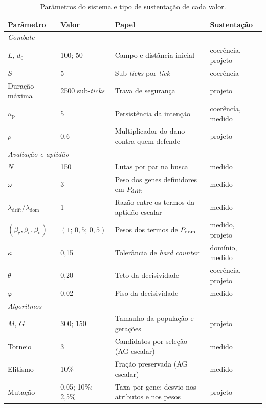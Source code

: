 \begin{table}[htbp]
    \caption{Parâmetros do sistema e tipo de sustentação de cada valor.}
    \label{tab: parametros}
    \centering
    \footnotesize
    \begin{tabularx}{\textwidth}{l l X l}
        \toprule
        \textbf{Parâmetro} & \textbf{Valor} & \textbf{Papel} & \textbf{Sustentação} \\
        \midrule
        \multicolumn{4}{l}{\textit{Combate}} \\
        $L$, $d_0$ & 100; 50 & Campo e distância inicial & coerência, projeto \\
        $S$ & 5 & Sub-\textit{ticks} por \textit{tick} & coerência \\
        Duração máxima & 2500 sub-\textit{ticks} & Trava de segurança & projeto \\
        $n_{\mathrm{p}}$ & 5 & Persistência da intenção & coerência, medido \\
        $\rho$ & 0,6 & Multiplicador do dano contra quem defende & projeto \\
        \midrule
        \multicolumn{4}{l}{\textit{Avaliação e aptidão}} \\
        $N$ & 150 & Lutas por par na busca & medido \\
        $\omega$ & 3 & Peso dos genes definidores em $P_{\mathrm{drift}}$ & medido \\
        $\lambda_{\mathrm{drift}}/\lambda_{\mathrm{dom}}$ & 1 & Razão entre os termos da aptidão escalar & medido \\
        $(\beta_{\mathrm{g}}, \beta_{\mathrm{c}}, \beta_{\mathrm{d}})$ & $(1;\, 0{,}5;\, 0{,}5)$ & Pesos dos termos de $P_{\mathrm{dom}}$ & medido, projeto \\
        $\kappa$ & 0,15 & Tolerância de \textit{hard counter} & domínio, medido \\
        $\theta$ & 0,20 & Teto da decisividade & coerência, projeto \\
        $\varphi$ & 0,02 & Piso da decisividade & medido \\
        \midrule
        \multicolumn{4}{l}{\textit{Algoritmos}} \\
        $M$, $G$ & 300; 150 & Tamanho da população e gerações & projeto \\
        Torneio & 3 & Candidatos por seleção (AG escalar) & medido \\
        Elitismo & 10\% & Fração preservada (AG escalar) & medido \\
        Mutação & 0,05; 10\%; 2,5\% & Taxa por gene; desvio nos atributos e nos pesos & projeto \\

\end{tabularx}
\end{table}
